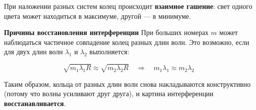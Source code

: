 \documentclass[a4paper,11pt]{article}
\theoremstyle{definition}
\begin{document}
    При наложении разных систем колец происходит \textbf{взаимное гашение}: свет одного цвета может находиться в максимуме,
    другой — в минимуме.

    \textbf{Причины восстановления интерференции}
    При больших номерах $m$ может наблюдаться частичное совпадение колец разных длин волн.
    Это возможно, если для двух длин волн $\lambda_1$ и $\lambda_2$ выполняется:

    \[
        \sqrt{m_1 \lambda_1 R} \approx \sqrt{m_2 \lambda_2 R} \quad \Rightarrow \quad m_1 \lambda_1 \approx m_2 \lambda_2
    \]

    Таким образом, кольца от разных длин волн снова накладываются конструктивно (потому что волны усиливают друг друга),
    и картина интерференции \textbf{восстанавливается}.
\end{document}
